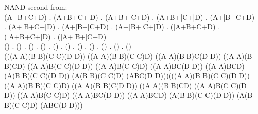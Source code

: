 NAND
 second from: $$$$(A+B+C+D) . (A+B+C+\bar D) . (A+B+\bar C+D) . (A+B+\bar C+\bar D) . (A+\bar B+C+D) . (A+\bar B+C+\bar D) . (A+\bar B+\bar C+D) . (A+\bar B+\bar C+\bar D) . (\bar A+B+C+D) . (\bar A+B+C+\bar D) . (\bar A+\bar B+\bar C+D)$$
$$() . () . () . () . () . () . () . () . () . () . ()$$
$$$$
$$(((A \uparrow  A)\uparrow (B \uparrow  B)\uparrow (C \uparrow  C)\uparrow (D \uparrow  D)) \uparrow  ((A \uparrow  A)\uparrow (B \uparrow  B)\uparrow (C \uparrow  C)\uparrow D) \uparrow  ((A \uparrow  A)\uparrow (B \uparrow  B)\uparrow C\uparrow (D \uparrow  D)) \uparrow  ((A \uparrow  A)\uparrow (B \uparrow  B)\uparrow C\uparrow D) \uparrow  ((A \uparrow  A)\uparrow B\uparrow (C \uparrow  C)\uparrow (D \uparrow  D)) \uparrow  ((A \uparrow  A)\uparrow B\uparrow (C \uparrow  C)\uparrow D) \uparrow  ((A \uparrow  A)\uparrow B\uparrow C\uparrow (D \uparrow  D)) \uparrow  ((A \uparrow  A)\uparrow B\uparrow C\uparrow D) \uparrow  (A\uparrow (B \uparrow  B)\uparrow (C \uparrow  C)\uparrow (D \uparrow  D)) \uparrow  (A\uparrow (B \uparrow  B)\uparrow (C \uparrow  C)\uparrow D) \uparrow  (A\uparrow B\uparrow C\uparrow (D \uparrow  D)))\uparrow (((A \uparrow  A)\uparrow (B \uparrow  B)\uparrow (C \uparrow  C)\uparrow (D \uparrow  D)) \uparrow  ((A \uparrow  A)\uparrow (B \uparrow  B)\uparrow (C \uparrow  C)\uparrow D) \uparrow  ((A \uparrow  A)\uparrow (B \uparrow  B)\uparrow C\uparrow (D \uparrow  D)) \uparrow  ((A \uparrow  A)\uparrow (B \uparrow  B)\uparrow C\uparrow D) \uparrow  ((A \uparrow  A)\uparrow B\uparrow (C \uparrow  C)\uparrow (D \uparrow  D)) \uparrow  ((A \uparrow  A)\uparrow B\uparrow (C \uparrow  C)\uparrow D) \uparrow  ((A \uparrow  A)\uparrow B\uparrow C\uparrow (D \uparrow  D)) \uparrow  ((A \uparrow  A)\uparrow B\uparrow C\uparrow D) \uparrow  (A\uparrow (B \uparrow  B)\uparrow (C \uparrow  C)\uparrow (D \uparrow  D)) \uparrow  (A\uparrow (B \uparrow  B)\uparrow (C \uparrow  C)\uparrow D) \uparrow  (A\uparrow B\uparrow C\uparrow (D \uparrow  D)))$$$$


